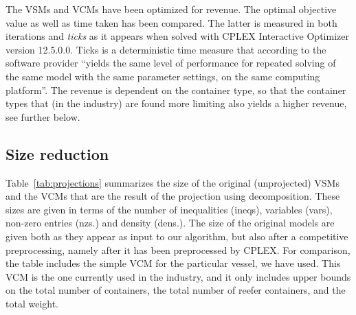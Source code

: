 \documentclass[citeauthoryear]{llncs}
\begin{document}
The VSMs and VCMs have been optimized for revenue. The optimal objective value as well as time taken has been compared. The latter is measured in both iterations and \emph{ticks} as it appears when solved with CPLEX Interactive Optimizer version 12.5.0.0. Ticks is a deterministic time measure that according to the software provider ``yields the same level of performance for repeated solving of the same model with the same parameter settings, on the same computing platform''. The revenue is dependent on the container type, so that the container types that (in the industry) are found more limiting also yields a higher revenue, see further below. 

\subsection{Size reduction}
Table~\ref{tab:projections} summarizes the size of the original (unprojected) VSMs and the VCMs that are the result of the projection using decomposition. These sizes are given in terms of the number of inequalities (ineqs), variables (vars), non-zero entries (nzs.) and density (dens.). The size of the original models are given both as they appear as input to our algorithm, but also after a {competitive} preprocessing, namely after it has been preprocessed by CPLEX. For comparison, the table includes the simple VCM for the particular vessel, we have used. This VCM is the one currently used in the industry, and it only includes upper bounds on the total number of containers, the total number of reefer containers, and the total weight.  
\end{document}
